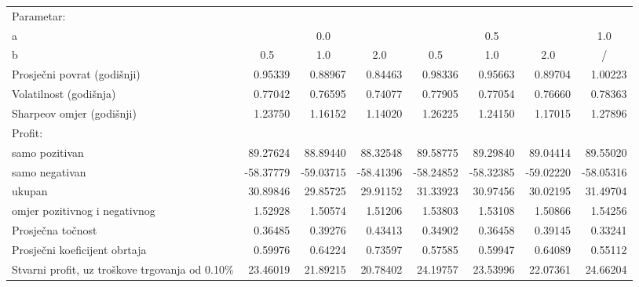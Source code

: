 \begin{sidewaystable}[p]
  \centering
  \label{table:results-1}
  \begin{tabularx}{\hsize}{Xrrrrrrr}
    \toprule
    Parametar: & & & & & & & \\
    \quad a & \multicolumn{3}{c}{0.0} & \multicolumn{3}{c}{0.5} & \multicolumn{1}{c}{1.0} \\ \cmidrule(lr){2-4} \cmidrule(lr){5-7} \cmidrule(lr){8-8}
    \quad b & \multicolumn{1}{c}{0.5} & \multicolumn{1}{c}{1.0} & \multicolumn{1}{c}{2.0} & \multicolumn{1}{c}{0.5} & \multicolumn{1}{c}{1.0} & \multicolumn{1}{c}{2.0} & \multicolumn{1}{c}{/} \\ \midrule
    Prosječni povrat (godišnji) & 0.95339 & 0.88967 & 0.84463 & 0.98336 & 0.95663 & 0.89704 & 1.00223 \\
    Volatilnost (godišnja) & 0.77042 & 0.76595 & 0.74077 & 0.77905 & 0.77054 & 0.76660 & 0.78363 \\
    Sharpeov omjer (godišnji) & 1.23750 & 1.16152 & 1.14020 & 1.26225 & 1.24150 & 1.17015 & 1.27896 \\ \midrule
    Profit: &  &  &  &  &  &  &  \\
    \quad samo pozitivan & 89.27624 & 88.89440 & 88.32548 & 89.58775 & 89.29840 & 89.04414 & 89.55020 \\
    \quad samo negativan & -58.37779 & -59.03715 & -58.41396 & -58.24852 & -58.32385 & -59.02220 & -58.05316 \\
    \quad ukupan & 30.89846 & 29.85725 & 29.91152 & 31.33923 & 30.97456 & 30.02195 & 31.49704 \\
    \quad omjer pozitivnog i negativnog & 1.52928 & 1.50574 & 1.51206 & 1.53803 & 1.53108 & 1.50866 & 1.54256 \\ \midrule
    Prosječna točnost & 0.36485 & 0.39276 & 0.43413 & 0.34902 & 0.36458 & 0.39145 & 0.33241 \\
    Prosječni koeficijent obrtaja & 0.59976 & 0.64224 & 0.73597 & 0.57585 & 0.59947 & 0.64089 & 0.55112 \\ \midrule
    Stvarni profit, uz troškove trgovanja od 0.10\% & 23.46019 & 21.89215 & 20.78402 & 24.19757 & 23.53996 & 22.07361 & 24.66204 \\ \bottomrule
  \end{tabularx}
\end{sidewaystable}
